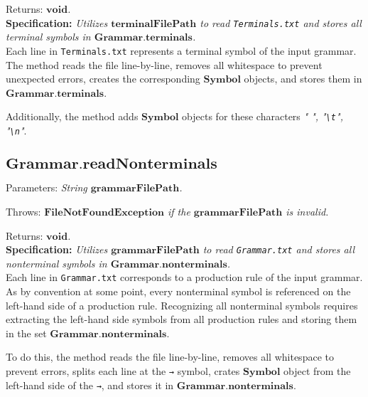 Returns: \textit{\(\boldsymbol{void}\).}\\

\textbf{Specification:} \textit{Utilizes \(\boldsymbol{terminalFilePath}\) to read \texttt{Terminals.txt} and stores all terminal symbols in \(\boldsymbol{Grammar.terminals}\).}\\

Each line in \texttt{Terminals.txt} represents a terminal symbol of the input grammar. The method reads the file line-by-line, removes all whitespace to prevent unexpected errors, creates the corresponding \(\boldsymbol{Symbol}\) objects, and stores them in \(\boldsymbol{Grammar.terminals}\).

Additionally, the method adds \(\boldsymbol{Symbol}\) objects for these characters \textit{" ", "\texttt{\textbackslash t}", "\texttt{\textbackslash n}"}.

\vspace{30pt}

\subsection{\(\boldsymbol{Grammar.readNonterminals}\)}

Parameters: \textit{String \(\boldsymbol{grammarFilePath}\).}

Throws: \textit{\(\boldsymbol{FileNotFoundException}\) if the \(\boldsymbol{grammarFilePath}\) is invalid.}

Returns: \textit{\(\boldsymbol{void}\).}\\

\textbf{Specification:} \textit{Utilizes \(\boldsymbol{grammarFilePath}\) to read \texttt{Grammar.txt} and stores all nonterminal symbols in \(\boldsymbol{Grammar.nonterminals}\).}\\

Each line in \texttt{Grammar.txt} corresponds to a production rule of the input grammar. As by convention at some point, every nonterminal symbol is referenced on the left-hand side of a production rule. Recognizing all nonterminal symbols requires extracting the left-hand side symbols from all production rules and storing them in the set \(\boldsymbol{Grammar.nonterminals}\).

To do this, the method reads the file line-by-line, removes all whitespace to prevent errors, splits each line at the \texttt{→} symbol, crates \(\boldsymbol{Symbol}\) object from the left-hand side of the \texttt{→}, and stores it in \(\boldsymbol{Grammar.nonterminals}\).

